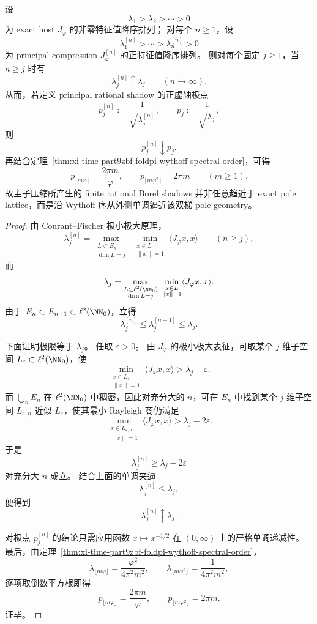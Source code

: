 \begin{theorem}\label{thm:xi-time-part9zbi-ritz-wythoff-convergence}
设
\[
\lambda_1>\lambda_2>\cdots>0
\]
为 exact host \(J_\varphi\) 的非零特征值降序排列；
对每个 \(n\ge 1\)，设
\[
\lambda_1^{[n]}>\cdots>\lambda_n^{[n]}>0
\]
为 principal compression \(J_\varphi^{[n]}\) 的正特征值降序排列。
则对每个固定 \(j\ge 1\)，当 \(n\ge j\) 时有
\[
\lambda_j^{[n]}\uparrow \lambda_j
\qquad (n\to\infty).
\]
从而，若定义 principal rational shadow 的正虚轴极点
\[
p_j^{[n]}:=\frac{1}{\sqrt{\lambda_j^{[n]}}},
\qquad
p_j:=\frac{1}{\sqrt{\lambda_j}},
\]
则
\[
p_j^{[n]}\downarrow p_j.
\]
再结合定理~\ref{thm:xi-time-part9zbf-foldpi-wythoff-spectral-order}，可得
\[
p_{\lfloor m\varphi\rfloor}=\frac{2\pi m}{\varphi},
\qquad
p_{\lfloor m\varphi^2\rfloor}=2\pi m
\qquad (m\ge 1).
\]
故主子压缩所产生的 finite rational Borel shadows 并非任意趋近于 exact pole lattice，而是沿 Wythoff 序从外侧单调逼近该双梯 pole geometry。
\end{theorem}
\begin{proof}
由 Courant--Fischer 极小极大原理，
\[
\lambda_j^{[n]}
=
\max_{\substack{L\subset E_n\\ \dim L=j}}
\ \min_{\substack{x\in L\\ \|x\|=1}}
\langle J_\varphi x,x\rangle
\qquad (n\ge j),
\]
而
\[
\lambda_j
=
\max_{\substack{L\subset \ell^2(\NN_0)\\ \dim L=j}}
\ \min_{\substack{x\in L\\ \|x\|=1}}
\langle J_\varphi x,x\rangle.
\]
由于 \(E_n\subset E_{n+1}\subset \ell^2(\NN_0)\)，立得
\[
\lambda_j^{[n]}\le \lambda_j^{[n+1]}\le \lambda_j.
\]

下面证明极限等于 \(\lambda_j\)。
任取 \(\varepsilon>0\)。
由 \(J_\varphi\) 的极小极大表征，可取某个 \(j\)-维子空间 \(L_\varepsilon\subset \ell^2(\NN_0)\)，使
\[
\min_{\substack{x\in L_\varepsilon\\ \|x\|=1}}
\langle J_\varphi x,x\rangle
>
\lambda_j-\varepsilon.
\]
而 \(\bigcup_n E_n\) 在 \(\ell^2(\NN_0)\) 中稠密，因此对充分大的 \(n\)，可在 \(E_n\) 中找到某个 \(j\)-维子空间 \(L_{\varepsilon,n}\) 近似 \(L_\varepsilon\)，使其最小 Rayleigh 商仍满足
\[
\min_{\substack{x\in L_{\varepsilon,n}\\ \|x\|=1}}
\langle J_\varphi x,x\rangle
>
\lambda_j-2\varepsilon.
\]
于是
\[
\lambda_j^{[n]}\ge \lambda_j-2\varepsilon
\]
对充分大 \(n\) 成立。
结合上面的单调夹逼
\[
\lambda_j^{[n]}\le \lambda_j,
\]
便得到
\[
\lambda_j^{[n]}\uparrow \lambda_j.
\]

对极点 \(p_j^{[n]}\) 的结论只需应用函数 \(x\mapsto x^{-1/2}\) 在 \((0,\infty)\) 上的严格单调递减性。
最后，由定理~\ref{thm:xi-time-part9zbf-foldpi-wythoff-spectral-order}，
\[
\lambda_{\lfloor m\varphi\rfloor}=\frac{\varphi^2}{4\pi^2m^2},
\qquad
\lambda_{\lfloor m\varphi^2\rfloor}=\frac{1}{4\pi^2m^2},
\]
逐项取倒数平方根即得
\[
p_{\lfloor m\varphi\rfloor}=\frac{2\pi m}{\varphi},
\qquad
p_{\lfloor m\varphi^2\rfloor}=2\pi m.
\]
证毕。
\end{proof}

